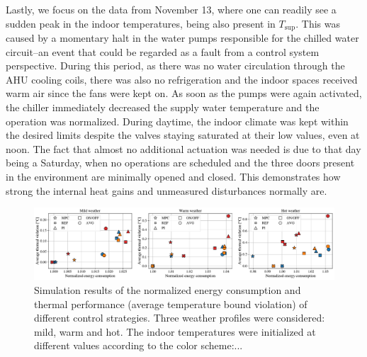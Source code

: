 Lastly, we focus on the data from November 13, where one can readily see a sudden peak in the indoor temperatures, being also present in $T_{\text{sup}}$. This was caused by a momentary halt in the water pumps responsible for the chilled water circuit--an event that could be regarded as a fault from a control system perspective. During this period, as there was no water circulation through the AHU cooling coils, there was also no refrigeration and the indoor spaces received warm air since the fans were kept on. As soon as the pumps were again activated, the chiller immediately decreased the supply water temperature and the operation was normalized. During daytime, the indoor climate was kept within the desired limits despite the valves staying saturated at their low values, even at noon. The fact that almost no additional actuation was needed is due to that day being a Saturday, when no operations are scheduled and the three doors present in the environment are minimally opened and closed. This demonstrates how strong the internal heat gains and unmeasured disturbances normally are.

\begin{figure}[!t]
	\hspace{0pt}
	\includegraphics[width=0.95\linewidth]{../images/chap3_simres.pdf} 
	\caption{Simulation results of the normalized energy consumption and thermal performance (average temperature bound violation) of different control strategies. Three weather profiles were considered: mild, warm and hot. The indoor temperatures were initialized at different values according to the color scheme:...} 
	\label{fig.powerRes}
\end{figure}


